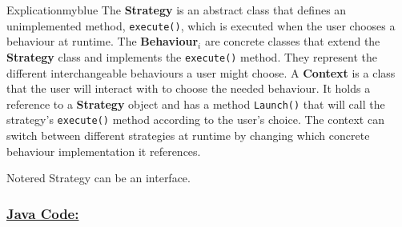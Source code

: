 \vspace{1cm}

\begin{prettyBox}{Explication}{myblue}
The \textbf{Strategy} is an abstract class that defines an unimplemented method, \texttt{execute()}, which is executed when the user chooses a behaviour at runtime.
\vspace{0.25cm}
The \textbf{Behaviour\(_i\)} are concrete classes that extend the \textbf{Strategy} class and implements the \texttt{execute()} method. 
They represent the different interchangeable behaviours a user might choose.
\vspace{0.25cm}
A \textbf{Context} is a class that the user will interact with to choose the needed behaviour. It holds a reference to a \textbf{Strategy} object
and has a method \texttt{Launch()} that will call the strategy's \texttt{execute()} method according to the user's choice. 
The context can switch between different strategies at runtime by changing which concrete behaviour implementation it references.
\end{prettyBox}

\vspace{0.25cm}

\begin{prettyBox}{Note}{red}
Strategy can be an interface.
\end{prettyBox}

\vspace{0.5cm}
\subsubsection*{\underline{Java Code:}}



\newpage


\vspace{1cm}


\vspace{1cm}


\vspace{1cm}


\newpage

